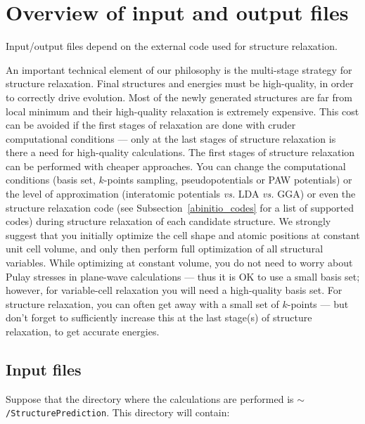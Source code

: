 \documentclass[12pt]{article}
\newcommand{\file}[1]{\texttt{#1}}
\begin{document}
\newpage
\section{Overview of input and output files}

Input/output files depend on the external code used for structure relaxation.

An important technical element of our philosophy is the multi-stage strategy for
structure relaxation. Final structures and energies must be high-quality, in
order to correctly drive evolution. Most of the newly generated structures are
far from local minimum and their high-quality relaxation is extremely expensive.
This cost can be avoided if the first stages of relaxation are done with cruder
computational conditions --- only at the last stages of structure relaxation is
there a need for high-quality calculations. The first stages of structure
relaxation can be performed with cheaper approaches. You can change the
computational conditions (basis set, $k$-points sampling, pseudopotentials or
PAW potentials) or the level of approximation (interatomic potentials \emph{vs.}
LDA \emph{vs.} GGA) or even the structure relaxation code (see
Subsection~\ref{abinitio_codes} for a list of supported codes) during structure
relaxation of each candidate structure. We strongly suggest that you initially
optimize the cell shape and atomic positions at constant unit cell volume, and
only then perform full optimization of all structural variables. While
optimizing at constant volume, you do not need to worry about Pulay stresses in
plane-wave calculations --- thus it is OK to use a small basis set; however, for
variable-cell relaxation you will need a high-quality basis set. For structure
relaxation, you can often get away with a small set of $k$-points --- but don't
forget to sufficiently increase this at the last stage(s) of structure
relaxation, to get accurate energies.

\subsection{Input files}

Suppose that the directory where the calculations are performed is
\file{$\sim$/StructurePrediction}. This directory will contain:
\end{document}
